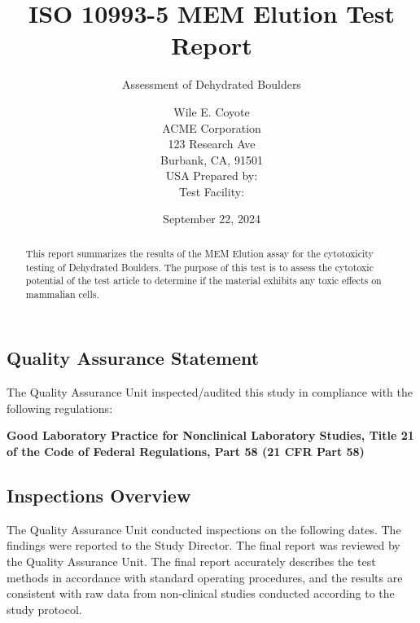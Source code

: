 \documentclass[
  12pt,
]{article}
\title{ISO 10993-5 MEM Elution Test Report}
\subtitle{Assessment of Dehydrated Boulders}
\author{\vspace{20pt}

Wile E. Coyote\\
ACME Corporation\\
123 Research Ave\\
Burbank, CA, 91501\\
USA Prepared by:\\
Test Facility:\\}
\date{September 22, 2024}
\begin{document}
\maketitle
\begin{abstract}
This report summarizes the results of the MEM Elution assay for the
cytotoxicity testing of Dehydrated Boulders. The purpose of this test is
to assess the cytotoxic potential of the test article to determine if
the material exhibits any toxic effects on mammalian cells.
\end{abstract}

{
\setcounter{tocdepth}{2}
\tableofcontents
}
\newpage

\subsection{Quality Assurance
Statement}\label{quality-assurance-statement}

The Quality Assurance Unit inspected/audited this study in compliance
with the following regulations:

\textbf{Good Laboratory Practice for Nonclinical Laboratory Studies,
Title 21 of the Code of Federal Regulations, Part 58 (21 CFR Part 58)}

\subsection{Inspections Overview}\label{inspections-overview}

The Quality Assurance Unit conducted inspections on the following dates.
The findings were reported to the Study Director. The final report was
reviewed by the Quality Assurance Unit. The final report accurately
describes the test methods in accordance with standard operating
procedures, and the results are consistent with raw data from
non-clinical studies conducted according to the study protocol.
\end{document}
